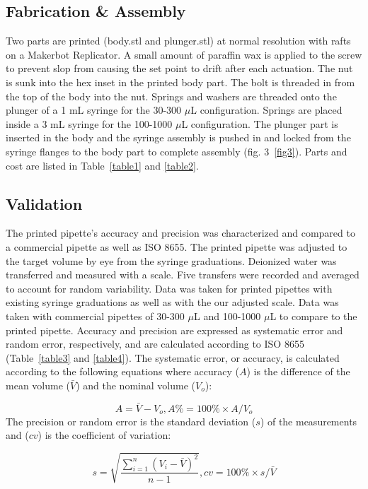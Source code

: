 \documentclass{naturegraphicx}
\begin{document}
\begin{methods}
\subsection{Fabrication \& Assembly}
Two parts are printed (body.stl and plunger.stl) at normal resolution with rafts on a Makerbot Replicator.
A small amount of paraffin wax is applied to the screw to prevent slop from causing the set point to drift after each actuation.
The nut is sunk into the hex inset in the printed body part.
The bolt is threaded in from the top of the body into the nut.
Springs and washers are threaded onto the plunger of a 1 mL syringe for the 30-300 $\mu$L configuration.
Springs are placed inside a 3 mL syringe for the 100-1000 $\mu$L configuration.
The plunger part is inserted in the body and the syringe assembly is pushed in and locked from the syringe flanges to the body part to complete assembly (fig. 3~\ref{fig3}).
Parts and cost are listed in Table~\ref{table1} and \ref{table2}.

\subsection{Validation}
The printed pipette’s accuracy and precision was characterized and compared to a commercial pipette as well as ISO 8655.
The printed pipette was adjusted to the target volume by eye from the syringe graduations.
Deionized water was transferred and measured with a scale.
Five transfers were recorded and averaged to account for random variability.
Data was taken for printed pipettes with existing syringe graduations as well as with the our adjusted scale.
Data was taken with commercial pipettes of 30-300 $\mu$L and 100-1000 $\mu$L to compare to the printed pipette.
Accuracy and precision are expressed as systematic error and random error, respectively, and are calculated according to ISO 8655~\cite{ISO8655} (Table~\ref{table3} and \ref{table4}).
The systematic error, or accuracy, is calculated according to the following equations where accuracy ($A$) is the difference of the mean volume ($\bar{V}$) and the nominal volume ($V_{o}$):

\begin{equation}\label{eq:accuracy} 
A = \bar{V}-V_{o},
A\% = 100\%  \times  A / V_{o}
\end{equation}
The precision or random error is the standard deviation ($s$) of the measurements and ($cv$) is the coefficient of variation:

\begin{equation}\label{eq:precision} 
s = \sqrt{\frac{\sum_{i=1}^{n}(V_{i}-\bar{V})^2}{n-1}},
cv = 100\% \times s / \bar{V}
\end{equation}

\end{methods}
\end{document}
